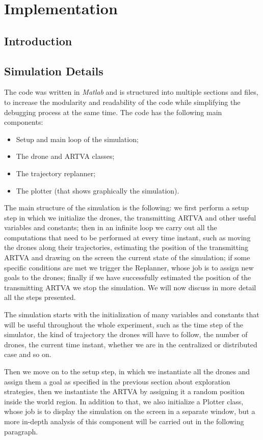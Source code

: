 \chapter{Implementation}
\section{Introduction}
\section{Simulation Details}
The code was written in \textit{Matlab} and is structured into multiple sections and files, to increase the modularity and readability of the code while simplifying the debugging process at the same time. The code has the following main components: 

\begin{itemize}
    \item Setup and main loop of the simulation;
    \item The drone and ARTVA classes;
    \item The trajectory replanner;
    \item The plotter (that shows graphically the simulation).
\end{itemize}

The main structure of the simulation is the following: we first perform a setup step in which we initialize the drones, the transmitting ARTVA and other useful variables and constants; then in an infinite loop we carry out all the computations that need to be performed at every time instant, such as moving the drones along their trajectories, estimating the position of the transmitting ARTVA and drawing on the screen the current state of the simulation; if some specific conditions are met we trigger the Replanner, whose job is to assign new goals to the drones; finally if we have successfully estimated the position of the transmitting ARTVA we stop the simulation. We will now discuss in more detail all the steps presented.

The simulation starts with the initialization of many variables and constants that will be useful throughout the whole experiment, such as the time step of the simulator, the kind of trajectory the drones will have to follow, the number of drones, the current time instant, whether we are in the centralized or distributed case and so on.

Then we move on to the setup step, in which we instantiate all the drones and assign them a goal as specified in the previous section about exploration strategies, then we instantiate the ARTVA by assigning it a random position inside the world region. In addition to that, we also initialize a Plotter class, whose job is to display the simulation on the screen in a separate window, but a more in-depth analysis of this component will be carried out in the following paragraph.

